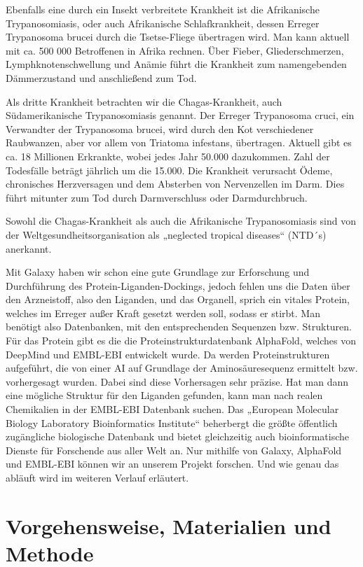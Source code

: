 \documentclass[11pt]{article}
\begin{document}
    Ebenfalls eine durch ein Insekt verbreitete Krankheit ist die Afrikanische Trypanosomiasis, oder auch Afrikanische Schlafkrankheit, dessen Erreger Trypanosoma brucei durch die Tsetse-Fliege übertragen wird. Man kann aktuell mit ca. 500 000 Betroffenen in Afrika rechnen. Über Fieber, Gliederschmerzen, Lymphknotenschwellung und Anämie führt die Krankheit zum namengebenden Dämmerzustand und anschließend zum Tod.

    Als dritte Krankheit betrachten wir die Chagas-Krankheit, auch Südamerikanische Trypanosomiasis genannt. Der Erreger Trypanosoma cruci, ein Verwandter der Trypanosoma brucei, wird durch den Kot verschiedener Raubwanzen, aber vor allem von Triatoma infestans, übertragen. Aktuell gibt es ca. 18 Millionen Erkrankte, wobei jedes Jahr 50.000 dazukommen. Zahl der Todesfälle beträgt jährlich um die 15.000. Die Krankheit verursacht Ödeme, chronisches Herzversagen und dem Absterben von Nervenzellen im Darm. Dies führt mitunter zum Tod durch Darmverschluss oder Darmdurchbruch.

    Sowohl die Chagas-Krankheit als auch die Afrikanische Trypanosomiasis sind von der Weltgesundheitsorganisation als „neglected tropical diseases“ (NTD´s) anerkannt.

    Mit Galaxy haben wir schon eine gute Grundlage zur Erforschung und Durchführung des Protein-Liganden-Dockings, jedoch fehlen uns die Daten über den Arzneistoff, also den Liganden, und das Organell, sprich ein vitales Protein, welches im Erreger außer Kraft gesetzt werden soll, sodass er stirbt. Man benötigt also Datenbanken, mit den entsprechenden Sequenzen bzw. Strukturen. Für das Protein gibt es die die Proteinstrukturdatenbank AlphaFold, welches von DeepMind und EMBL-EBI entwickelt wurde. Da werden Proteinstrukturen aufgeführt, die von einer AI auf Grundlage der Aminosäuresequenz ermittelt bzw. vorhergesagt wurden. Dabei sind diese Vorhersagen sehr präzise. Hat man dann eine mögliche Struktur für den Liganden gefunden, kann man nach realen Chemikalien in der EMBL-EBI Datenbank suchen. Das „European Molecular Biology Laboratory Bioinformatics Institute“ beherbergt die größte öffentlich zugängliche biologische Datenbank und bietet gleichzeitig auch bioinformatische Dienste für Forschende aus aller Welt an. Nur mithilfe von Galaxy, AlphaFold und EMBL-EBI können wir an unserem Projekt forschen. Und wie genau das abläuft wird im weiteren Verlauf erläutert.


    \section{Vorgehensweise, Materialien und Methode}
\end{document}
